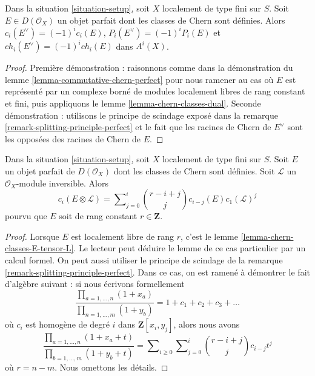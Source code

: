 \begin{lemma}
\label{lemma-chern-classes-perfect-dual}
Dans la situation \ref{situation-setup}, soit $X$ localement de type fini sur $S$.
Soit $E \in D(\mathcal{O}_X)$ un objet parfait dont les classes de Chern sont
définies. Alors $c_i(E^\vee) = (-1)^i c_i(E)$, $P_i(E^\vee) = (-1)^iP_i(E)$
et $ch_i(E^\vee) = (-1)^ich_i(E)$ dans $A^i(X)$.
\end{lemma}

\begin{proof}
Première démonstration : raisonnons comme dans la démonstration du
lemme \ref{lemma-commutative-chern-perfect}
pour nous ramener au cas où $E$ est représenté
par un complexe borné de modules localement libres de rang
constant et fini, puis appliquons le lemme \ref{lemma-chern-classes-dual}.
Seconde démonstration : utilisons le principe de scindage exposé
dans la remarque \ref{remark-splitting-principle-perfect}
et le fait que les racines de Chern de $E^\vee$ sont les opposées
des racines de Chern de $E$.
\end{proof}

\begin{lemma}
\label{lemma-chern-class-perfect-tensor-invertible}
Dans la situation \ref{situation-setup}, soit $X$ localement de type fini sur $S$.
Soit $E$ un objet parfait de $D(\mathcal{O}_X)$ dont les classes de Chern
sont définies.
Soit $\mathcal{L}$ un $\mathcal{O}_X$-module inversible. Alors
$$
c_i(E \otimes \mathcal{L}) =
\sum\nolimits_{j = 0}^i
\binom{r - i + j}{j} c_{i - j}(E) c_1(\mathcal{L})^j
$$
pourvu que $E$ soit de rang constant $r \in \mathbf{Z}$.
\end{lemma}

\begin{proof}
Lorsque $E$ est localement libre de rang $r$, c'est le
lemme \ref{lemma-chern-classes-E-tensor-L}. Le lecteur peut déduire
le lemme de ce cas particulier par un calcul formel.
On peut aussi utiliser le principe de scindage de la
remarque \ref{remark-splitting-principle-perfect}.
Dans ce cas, on est ramené à démontrer le fait
d'algèbre suivant : si nous écrivons formellement
$$
\frac{\prod_{a = 1, \ldots, n} (1 + x_a)}{\prod_{n = 1, \ldots, m} (1 + y_b)}
= 1 + c_1 + c_2 + c_3 + \ldots
$$
où $c_i$ est homogène de degré $i$
dans $\mathbf{Z}[x_i, y_j]$, alors nous avons
$$
\frac{\prod_{a = 1, \ldots, n} (1 + x_a + t)}{\prod_{b = 1, \ldots, m} (1 + y_b + t)}
= \sum\nolimits_{i \geq 0} \sum\nolimits_{j = 0}^i
\binom{r - i + j}{j} c_{i - j} t^j
$$
où $r = n - m$. Nous omettons les détails.
\end{proof}

